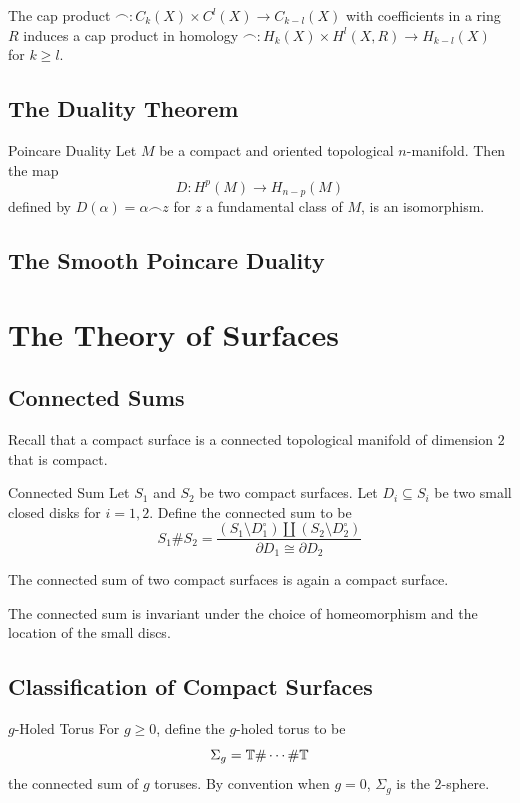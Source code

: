 \documentclass[a4paper]{article}
\begin{document}
\begin{lmm}{}{} The cap product $\frown: C_k(X)\times C^l(X)\to C_{k-l}(X)$ with coefficients in a ring $R$ induces a cap product in homology $\frown: H_k(X)\times H^l(X,R)\to H_{k-l}(X)$ for $k\geq l$. 
\end{lmm}

\subsection{The Duality Theorem}
\begin{thm}{Poincare Duality}{} Let $M$ be a compact and oriented topological $n$-manifold. Then the map $$D:H^p(M)\to H_{n-p}(M)$$ defined by $D(\alpha)=\alpha\frown z$ for $z$ a fundamental class of $M$, is an isomorphism. 
\end{thm}

\subsection{The Smooth Poincare Duality}

\pagebreak
\section{The Theory of Surfaces}
\subsection{Connected Sums}
Recall that a compact surface is a connected topological manifold of dimension $2$ that is compact. 

\begin{defn}{Connected Sum}{} Let $S_1$ and $S_2$ be two compact surfaces. Let $D_i\subseteq S_i$ be two small closed disks for $i=1,2$. Define the connected sum to be $$S_1\# S_2=\frac{(S_1\setminus D_1^\circ)\amalg(S_2\setminus D_2^\circ)}{\partial D_1\cong\partial D_2}$$
\end{defn}

\begin{lmm}{}{} The connected sum of two compact surfaces is again a compact surface. 
\end{lmm}

\begin{prp}{}{} The connected sum is invariant under the choice of homeomorphism and the location of the small discs. 
\end{prp}

\subsection{Classification of Compact Surfaces}
\begin{defn}{$g$-Holed Torus}{} For $g\geq 0$, define the $g$-holed torus to be $$\Sigma_g=\mathbb{T}\#\cdots\#\mathbb{T}$$ the connected sum of $g$ toruses. By convention when $g=0$, $\Sigma_g$ is the $2$-sphere. 
\end{defn}
\end{document}
